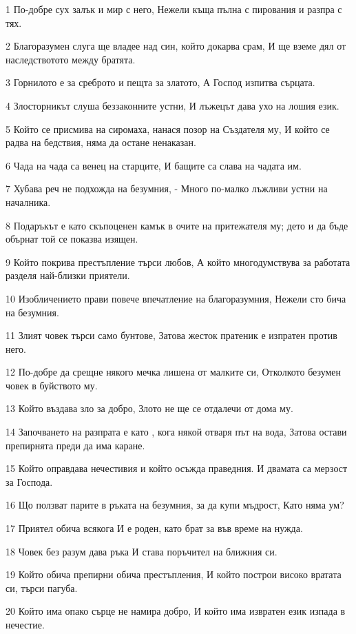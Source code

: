 \par 1 По-добре сух залък и мир с него, Нежели къща пълна с пирования и разпра с тях.
\par 2 Благоразумен слуга ще владее над син, който докарва срам, И ще вземе дял от наследствотото между братята.
\par 3 Горнилото е за среброто и пещта за златото, А Господ изпитва сърцата.
\par 4 Злосторникът слуша беззаконните устни, И лъжецът дава ухо на лошия език.
\par 5 Който се присмива на сиромаха, нанася позор на Създателя му, И който се радва на бедствия, няма да остане ненаказан.
\par 6 Чада на чада са венец на старците, И бащите са слава на чадата им.
\par 7 Хубава реч не подхожда на безумния, - Много по-малко лъжливи устни на началника.
\par 8 Подаръкът е като скъпоценен камък в очите на притежателя му; дето и да бъде обърнат той се показва изящен.
\par 9 Който покрива престъпление търси любов, А който многодумствува за работата разделя най-близки приятели.
\par 10 Изобличението прави повече впечатление на благоразумния, Нежели сто бича на безумния.
\par 11 Злият човек търси само бунтове, Затова жесток пратеник е изпратен против него.
\par 12 По-добре да срещне някого мечка лишена от малките си, Отколкото безумен човек в буйството му.
\par 13 Който въздава зло за добро, Злото не ще се отдалечи от дома му.
\par 14 Започването на разпрата е като , кога някой отваря път на вода, Затова остави препирнята преди да има каране.
\par 15 Който оправдава нечестивия и който осъжда праведния. И двамата са мерзост за Господа.
\par 16 Що ползват парите в ръката на безумния, за да купи мъдрост, Като няма ум?
\par 17 Приятел обича всякога И е роден, като брат за във време на нужда.
\par 18 Човек без разум дава ръка И става поръчител на ближния си.
\par 19 Който обича препирни обича престъпления, И който построи високо вратата си, търси пагуба.
\par 20 Който има опако сърце не намира добро, И който има извратен език изпада в нечестие.
